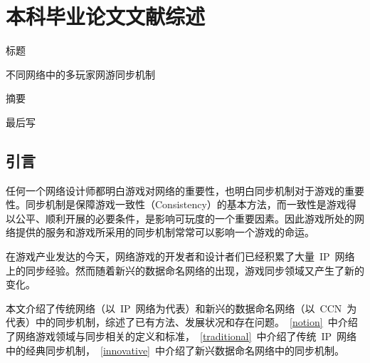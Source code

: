 \chapter{本科毕业论文文献综述}



%


\heiti
标题

\songti
不同网络中的多玩家网游同步机制

\heiti
摘要

\songti
最后写

\section{引言}
任何一个网络设计师都明白游戏对网络的重要性，也明白同步机制对于游戏的重要性。同步机制是保障游戏一致性（Consistency）的基本方法，而一致性是游戏得以公平、顺利开展的必要条件，是影响可玩度的一个重要因素。因此游戏所处的网络提供的服务和游戏所采用的同步机制常常可以影响一个游戏的命运。

在游戏产业发达的今天，网络游戏的开发者和设计者们已经积累了大量~IP~网络上的同步经验。然而随着新兴的数据命名网络的出现，游戏同步领域又产生了新的变化。

本文介绍了传统网络（以~IP~网络为代表）和新兴的数据命名网络（以~CCN~为代表）中的同步机制，综述了已有方法、发展状况和存在问题。~\ref{notion}~中介绍了网络游戏领域与同步相关的定义和标准，~\ref{traditional}~中介绍了传统~IP~网络中的经典同步机制，~\ref{innovative}~中介绍了新兴数据命名网络中的同步机制。


